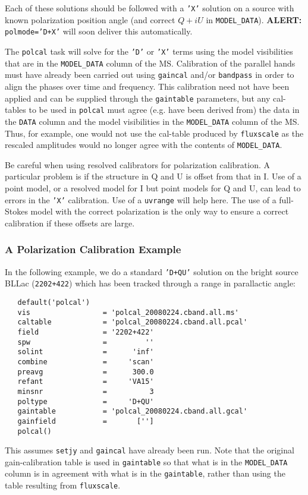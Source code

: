 Each of these solutions should be followed with a {\tt 'X'} solution
on a source with known polarization position angle (and correct $Q+iU$
in {\tt MODEL\_DATA}).  
{\bf ALERT:} {\tt polmode='D+X'} will soon deliver this automatically.
           
The {\tt polcal} task will solve for the {\tt 'D'} or {\tt 'X'} terms
using the model visibilities that are in the {\tt MODEL\_DATA} column
of the MS.  Calibration of the parallel hands must have already been
carried out using {\tt gaincal} and/or {\tt bandpass} in order to
align the phases over time and frequency.  This calibration need not
have been applied and can be supplied through the {\tt gaintable}
parameters, but any cal-tables to be used in {\tt polcal} must agree
(e.g. have been derived from) the data in the {\tt DATA} column and
the model visibilities in the {\tt MODEL\_DATA} column of the MS.
Thus, for example, one would not use the cal-table produced by
{\tt fluxscale} as the rescaled amplitudes would no longer agree with
the contents of {\tt MODEL\_DATA}.

Be careful when using resolved calibrators for polarization
calibration.  A particular problem is if the structure in Q and U is
offset from that in I.  Use of a point model, or a resolved model for
I but point models for Q and U, can lead to errors in the {\tt 'X'} 
calibration.  Use of a {\tt uvrange} will help here.  The use of a
full-Stokes model with the correct polarization is the only way to 
ensure a correct calibration if these offsets are large.

\subsubsection{A Polarization Calibration Example}
\label{section:cal.solve.pol.example}

In the following example, we do a standard {\tt 'D+QU'} solution on
the bright source BLLac ({\tt 2202+422}) which has been tracked
through a range in parallactic angle:
\small
\begin{verbatim}
   default('polcal')
   vis                 = 'polcal_20080224.cband.all.ms'
   caltable            = 'polcal_20080224.cband.all.pcal'
   field               = '2202+422'        
   spw                 =         ''        
   solint              =      'inf'    
   combine             =     'scan' 
   preavg              =      300.0        
   refant              =     'VA15'        
   minsnr              =          3        
   poltype             =     'D+QU'        
   gaintable           = 'polcal_20080224.cband.all.gcal'
   gainfield           =       ['']
   polcal()
\end{verbatim}
\normalsize
This assumes {\tt setjy} and {\tt gaincal} have already been run. 
Note that the original gain-calibration table is used in {\tt gaintable}
so that what is in the {\tt MODEL\_DATA} column is in agreement with
what is in the {\tt gaintable}, rather than using the table resulting
from {\tt fluxscale}.

